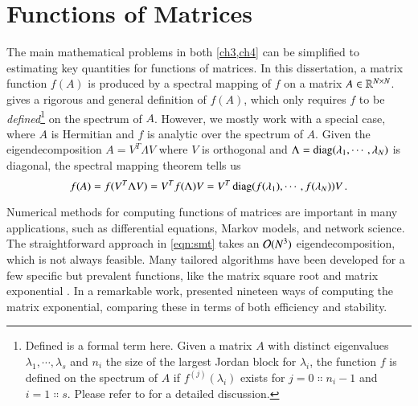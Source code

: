 \section{Functions of Matrices}\label{pre:fom}

The main mathematical problems in both \cref{ch3,ch4} can be simplified to
estimating key quantities for functions of matrices. In this dissertation, a
matrix function $f(A)$ is produced by a spectral mapping of $f$ on a matrix
$A\in\mathbb{R}^{N\mathbin{\times} N}$. \citet{higham2008functions} gives a rigorous and general
definition of $f(A)$, which only requires $f$ to be \emph{defined}\footnote{
Defined is a formal term here. Given a matrix $A$ with distinct
eigenvalues $\lambda_1,\cdots,\lambda_s$ and $n_i$ the size of the largest
Jordan block for $\lambda_i$, the function $f$ is defined on the spectrum of $A$
if $f^{(j)}(\lambda_i)$ exists for $j = 0\Colon n_i-1$ and $i = 1\Colon s$.
Please refer to \cite[Definition~1.1]{higham2008functions} for a detailed
discussion.} on the spectrum of $A$. However, we mostly work with a special
case, where $A$ is Hermitian and $f$ is analytic over the spectrum of $A$. Given
the eigendecomposition $A = V^T\Lambda V$ where $V$ is orthogonal and $\Lambda =
\operatorname{diag}(\lambda_1,\cdots,\lambda_N)$ is diagonal, the spectral mapping theorem
tells us
\begin{equation}\label{eqn:smt}
	f(A) = f(V^T\Lambda V) = V^T f(\Lambda)V = V^T\operatorname{diag}(f(\lambda_1),\cdots,f
	(\lambda_N))V\,.
\end{equation}

Numerical methods for computing functions of matrices are important in many
applications, such as differential equations, Markov models, and network
science. The straightforward approach in \cref{eqn:smt} takes an $\mathcal{O}(N^3)$
eigendecomposition, which is not always feasible. Many tailored algorithms have
been developed for a few specific but prevalent functions, like the matrix
square root and matrix exponential \cite[Chapter 6 \& 10]{higham2008functions}.
In a remarkable work, \citet{moler2003nineteen} presented nineteen ways of
computing the matrix exponential, comparing these in terms of both efficiency
and stability.

